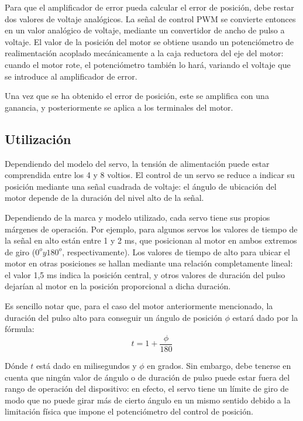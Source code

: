 \documentclass[../main]{subfiles}
\begin{document}

Para que el amplificador de error pueda calcular el error de
posición, debe restar dos valores de voltaje analógicos. La señal de
control PWM se convierte entonces en un valor analógico de voltaje,
mediante un convertidor de ancho de pulso a voltaje. El valor de la
posición del motor se obtiene usando un potenciómetro de
realimentación acoplado mecánicamente a la caja reductora del eje del
motor: cuando el motor rote, el potenciómetro también lo hará,
variando el voltaje que se introduce al amplificador de error.

Una vez que se ha obtenido el error de posición, este se amplifica
con una ganancia, y posteriormente se aplica a los terminales del motor.

\subsection{Utilización}
Dependiendo del modelo del servo, la tensión de alimentación puede
estar comprendida entre los 4 y 8 voltios. El control de un servo se
reduce a indicar su posición mediante una señal cuadrada de voltaje:
el ángulo de ubicación del motor depende de la duración del nivel
alto de la señal.

Dependiendo de la marca y modelo utilizado, cada servo tiene sus
propios márgenes de operación. Por ejemplo, para algunos servos los
valores de tiempo de la señal en alto están entre 1 y 2 ms, que
posicionan al motor en ambos extremos de giro ($0^o y 180^o$,
respectivamente). Los valores de tiempo de alto para ubicar el motor
en otras posiciones se hallan mediante una relación completamente
lineal: el valor 1,5 ms indica la posición central, y otros valores
de duración del pulso dejarían al motor en la posición proporcional a
dicha duración.

Es sencillo notar que, para el caso del motor anteriormente
mencionado, la duración del pulso alto para conseguir un ángulo de
posición $\phi$ estará dado por la fórmula:
\begin{equation}
  t=1+{\frac {\phi }{180}}
\end{equation}

Dónde $t$ está dado en milisegundos y  $\phi$  en grados. Sin
embargo, debe tenerse en cuenta que ningún valor de ángulo o de
duración de pulso puede estar fuera del rango de operación del
dispositivo: en efecto, el servo tiene un límite de giro de modo que
no puede girar más de cierto ángulo en un mismo sentido debido a la
limitación física que impone el potenciómetro del control de posición.
\end{document}
